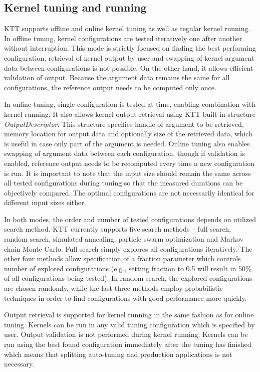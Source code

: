 \documentclass
[
    digital, %
    oneside, %
    table, %
    nolof, %
    nolot, %
    nocover %
]{fithesis3}
\begin{document}
\subsection{Kernel tuning and running}
KTT supports offline and online kernel tuning as well as regular kernel running. In offline tuning, kernel configurations are tested iteratively one
after another without interruption. This mode is strictly focused on finding the best performing configuration, retrieval of kernel output by user and
swapping of kernel argument data between configurations is not possible. On the other hand, it allows efficient validation of output. Because the
argument data remains the same for all configurations, the reference output needs to be computed only once.

In online tuning, single configuration is tested at time, enabling combination with kernel running. It also allows kernel output retrieval using
KTT built-in structure \textit{OutputDescriptor}. This structure specifies handle of argument to be retrieved, memory location for output data and
optionally size of the retrieved data, which is useful in case only part of the argument is needed. Online tuning also enables swapping of argument
data between each configuration, though if validation is enabled, reference output needs to be recomputed every time a new configuration is run.
It is important to note that the input size should remain the same across all tested configurations during tuning so that the measured durations
can be objectively compared. The optimal configurations are not necessarily identical for different input sizes either.

In both modes, the order and number of tested configurations depends on utilized search method. KTT currently supports five search methods -- full
search, random search, simulated annealing, particle swarm optimization and Markov chain Monte Carlo. Full search simply explores all configurations
iteratively. The other four methods allow specification of a fraction parameter which controls number of explored configurations (e.g., setting fraction
to 0.5 will result in 50\% of all configurations being tested). In random search, the explored configurations are chosen randomly, while the last three
methods employ probabilistic techniques in order to find configurations with good performance more quickly.

Output retrieval is supported for kernel running in the same fashion as for online tuning. Kernels can be run in any valid tuning configuration which is
specified by user. Output validation is not performed during kernel running. Kernels can be run using the best found configuration immediately after the
tuning has finished which means that splitting auto-tuning and production applications is not necessary.
\end{document}
